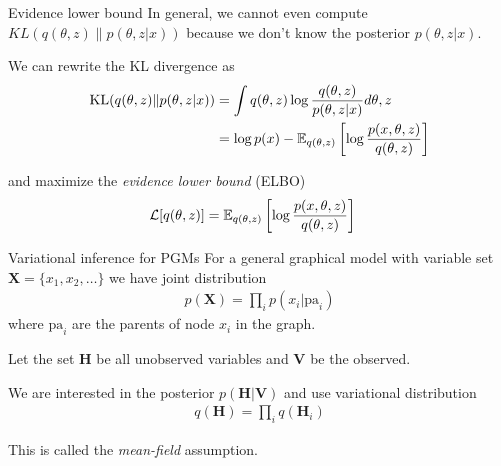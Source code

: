 \documentclass[10pt, compress]{beamer}
\begin{document}
\begin{frame}{Evidence lower bound}
	In general, we cannot even compute $KL(q(\theta, z)\|p(\theta, z | x))$
	because
	we don't know the posterior $p(\theta, z | x)$.

	\pause
	We can rewrite the KL divergence as
	\begin{align*}
		\textrm{KL}(q(\theta, z)\|p(\theta, z|x)) &= \int q(\theta, z)\log\frac{q(\theta, z)}{p(\theta, z | x)}d\theta, z \\
							&= \log p(x) - \mathbb{E}_{q(\theta, z)}\left[\log\frac{p(x, \theta, z)}{q(\theta, z)}\right]
	\end{align*}

	\pause
	and maximize the \emph{evidence lower bound} (ELBO)
	\begin{align*}
		\mathcal{L}[q(\theta, z)] &= \mathbb{E}_{q(\theta, z)}\left[\log\frac{p(x, \theta, z)}{q(\theta, z)}\right]
	\end{align*}
\end{frame}

\begin{frame}{Variational inference for PGMs}
	For a general graphical model
	with variable set $\mathbf{X} = \{x_1, x_2, \ldots\}$
	we have joint distribution
	\begin{align*}
		p(\mathbf{X}) = \prod_i p(x_i | \textrm{pa}_i)
	\end{align*}
	where $\textrm{pa}_i$ are the parents of node $x_i$
	in the graph.


	\pause
	Let the set $\mathbf{H}$ be
	all unobserved variables and $\mathbf{V}$ be the observed.


	\pause
	We are interested in the posterior $p(\mathbf{H} | \mathbf{V})$
	and use variational distribution 
	\begin{align*}
		q(\mathbf{H}) = \prod_i q(\mathbf{H}_i)
	\end{align*}

	\pause
	This is called the \emph{mean-field} assumption.

\end{frame}
\end{document}
